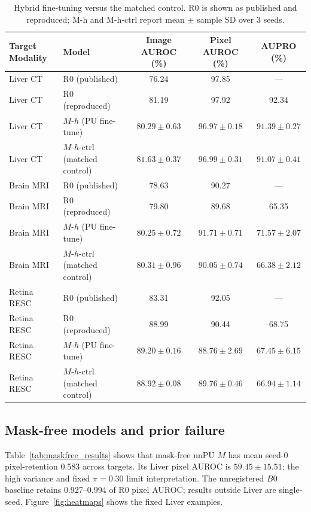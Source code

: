 \documentclass[10pt,twocolumn,letterpaper]{article}
\begin{document}
\begin{table}[t]
\centering
\small
\begin{tabular}{@{}llccc@{}}
\toprule
\textbf{Target Modality} & \textbf{Model} & \textbf{Image AUROC (\%)} & \textbf{Pixel AUROC (\%)} & \textbf{AUPRO (\%)} \\
\midrule
Liver CT & R0 (published) & 76.24 & 97.85 & — \\
Liver CT & R0 (reproduced) & 81.19 & 97.92 & 92.34 \\
Liver CT & $M\text{-}h$ (PU fine-tune) & $80.29 \pm 0.63$ & $96.97 \pm 0.18$ & $91.39 \pm 0.27$ \\
Liver CT & $M\text{-}h\text{-ctrl}$ (matched control) & $81.63 \pm 0.37$ & $96.99 \pm 0.31$ & $91.07 \pm 0.41$ \\
\midrule
Brain MRI & R0 (published) & 78.63 & 90.27 & — \\
Brain MRI & R0 (reproduced) & 79.80 & 89.68 & 65.35 \\
Brain MRI & $M\text{-}h$ (PU fine-tune) & $80.25 \pm 0.72$ & $91.71 \pm 0.71$ & $71.57 \pm 2.07$ \\
Brain MRI & $M\text{-}h\text{-ctrl}$ (matched control) & $80.31 \pm 0.96$ & $90.05 \pm 0.74$ & $66.38 \pm 2.12$ \\
\midrule
Retina RESC & R0 (published) & 83.31 & 92.05 & — \\
Retina RESC & R0 (reproduced) & 88.99 & 90.44 & 68.75 \\
Retina RESC & $M\text{-}h$ (PU fine-tune) & $89.20 \pm 0.16$ & $88.76 \pm 2.69$ & $67.45 \pm 6.15$ \\
Retina RESC & $M\text{-}h\text{-ctrl}$ (matched control) & $88.92 \pm 0.08$ & $89.76 \pm 0.46$ & $66.94 \pm 1.14$ \\
\bottomrule
\end{tabular}
\caption{Hybrid fine-tuning versus the matched control. R0 is shown as published and reproduced; M-h and M-h-ctrl report mean $\pm$ sample SD over 3 seeds.}
\label{tab:hybrid_results}
\end{table}
\subsection{Mask-free models and prior failure}
Table~\ref{tab:maskfree_results} shows that mask-free nnPU $M$ has mean seed-0 pixel-retention 0.583 across targets. Its Liver pixel AUROC is $59.45\pm15.51$; the high variance and fixed $\pi=0.30$ limit interpretation. The unregistered $B0$ baseline retains 0.927--0.994 of R0 pixel AUROC; results outside Liver are single-seed. Figure~\ref{fig:heatmaps} shows the fixed Liver examples.
\end{document}
